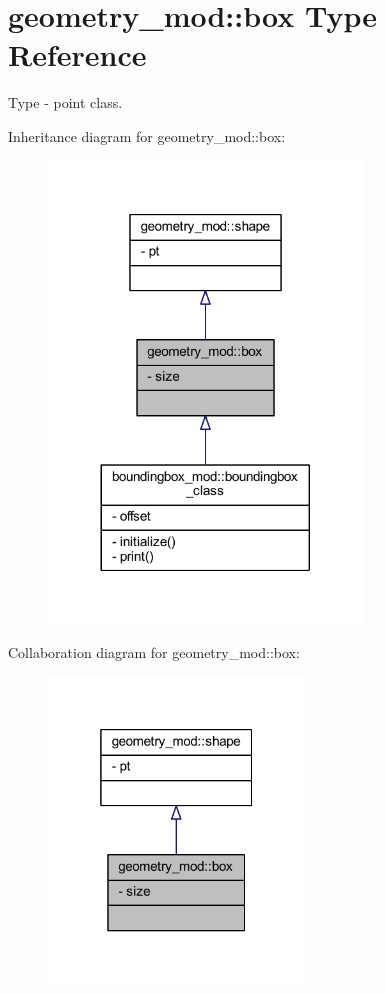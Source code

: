 \hypertarget{structgeometry__mod_1_1box}{}\section{geometry\+\_\+mod\+:\+:box Type Reference}
\label{structgeometry__mod_1_1box}


Type -\/ point class.  




Inheritance diagram for geometry\+\_\+mod\+:\+:box\+:\nopagebreak
\begin{figure}[H]
\begin{center}
\leavevmode
\includegraphics[width=236pt]{structgeometry__mod_1_1box__inherit__graph}
\end{center}
\end{figure}


Collaboration diagram for geometry\+\_\+mod\+:\+:box\+:\nopagebreak
\begin{figure}[H]
\begin{center}
\leavevmode
\includegraphics[width=193pt]{structgeometry__mod_1_1box__coll__graph}
\end{center}
\end{figure}
